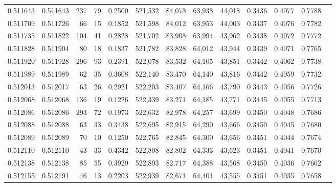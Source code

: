 \begin{tabular}{rrrrrrrrrrrrr}
0.511643 & 0.511643 &   237 &    79 &                                     0.2500 & 521,532 &  84,078 &  63,938 &  44,018 & 0.3436 & 0.4077 & 0.7788 \\
0.511709 & 0.511726 &    66 &    15 &                                     0.1852 & 521,598 &  84,012 &  63,953 &  44,003 & 0.3437 & 0.4076 & 0.7782 \\
0.511735 & 0.511822 &   104 &    41 &                                     0.2828 & 521,702 &  83,908 &  63,994 &  43,962 & 0.3438 & 0.4072 & 0.7772 \\
0.511828 & 0.511904 &    80 &    18 &                                     0.1837 & 521,782 &  83,828 &  64,012 &  43,944 & 0.3439 & 0.4071 & 0.7765 \\
0.511920 & 0.511928 &   296 &    93 &                                     0.2391 & 522,078 &  83,532 &  64,105 &  43,851 & 0.3442 & 0.4062 & 0.7738 \\
0.511989 & 0.511989 &    62 &    35 &                                     0.3608 & 522,140 &  83,470 &  64,140 &  43,816 & 0.3442 & 0.4059 & 0.7732 \\
0.512013 & 0.512017 &    63 &    26 &                                     0.2921 & 522,203 &  83,407 &  64,166 &  43,790 & 0.3443 & 0.4056 & 0.7726 \\
0.512068 & 0.512068 &   136 &    19 &                                     0.1226 & 522,339 &  83,271 &  64,185 &  43,771 & 0.3445 & 0.4055 & 0.7713 \\
0.512086 & 0.512086 &   293 &    72 &                                     0.1973 & 522,632 &  82,978 &  64,257 &  43,699 & 0.3450 & 0.4048 & 0.7686 \\
0.512088 & 0.512088 &    63 &    33 &                                     0.3438 & 522,695 &  82,915 &  64,290 &  43,666 & 0.3450 & 0.4045 & 0.7680 \\
0.512089 & 0.512089 &    70 &    10 &                                     0.1250 & 522,765 &  82,845 &  64,300 &  43,656 & 0.3451 & 0.4044 & 0.7674 \\
0.512110 & 0.512110 &    43 &    33 &                                     0.4342 & 522,808 &  82,802 &  64,333 &  43,623 & 0.3451 & 0.4041 & 0.7670 \\
0.512138 & 0.512138 &    85 &    55 &                                     0.3929 & 522,893 &  82,717 &  64,388 &  43,568 & 0.3450 & 0.4036 & 0.7662 \\
0.512155 & 0.512191 &    46 &    13 &                                     0.2203 & 522,939 &  82,671 &  64,401 &  43,555 & 0.3451 & 0.4035 & 0.7658 \\

\end{tabular}
